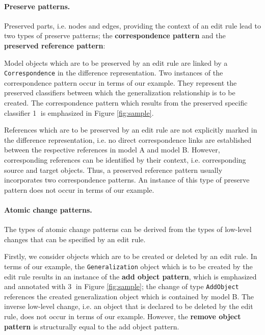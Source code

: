 \documentclass{llncs}
\begin{document}
\paragraph{Preserve patterns.}
Preserved parts, i.e. nodes and edges, providing the context of an edit rule lead to 
two types of preserve patterns; the \textbf{correspondence pattern}
and the \textbf{preserved reference pattern}:

Model objects which are to be preserved by an edit rule are linked 
by a \texttt{Correspondence} in the difference representation. 
Two instances of the correspondence pattern occur 
in terms of our example. 
They represent the preserved classifiers between which the 
generalization relationship is to be created.
The correspondence pattern which results from the preserved 
specific classifier \textcircled{1} is emphasized
in Figure \ref{fig:sample}.

References which are to be preserved by an edit rule
are not explicitly marked in the difference representation, 
i.e. no direct correspondence links are established between 
the respective references in model A and model B.
However, corresponding references can be identified by their 
context, i.e. corresponding source and target objects. Thus,
a preserved reference pattern usually incorporates two 
correspondence patterns. An instance of this type of 
preserve pattern does not occur in terms of our example.



\paragraph{Atomic change patterns.}
The types of atomic change patterns can be derived from the 
types of low-level changes that can be specified by an edit rule.

Firstly, we consider objects which are to be created or deleted
by an edit rule. In terms of our example,
the \texttt{Generalization} object which is to be created by the
edit rule results in an instance of the \textbf{add object pattern},
which is emphasized and annotated with \textcircled{3} in Figure \ref{fig:sample}; 
the change of type \texttt{AddObject} references the created 
generalization object which is contained by model B. The
inverse low-level change, i.e. an object that
is declared to be deleted by the edit rule, does not occur
in terms of our example. However,
the \textbf{remove object pattern} is structurally equal to 
the add object pattern.
  
\end{document}
